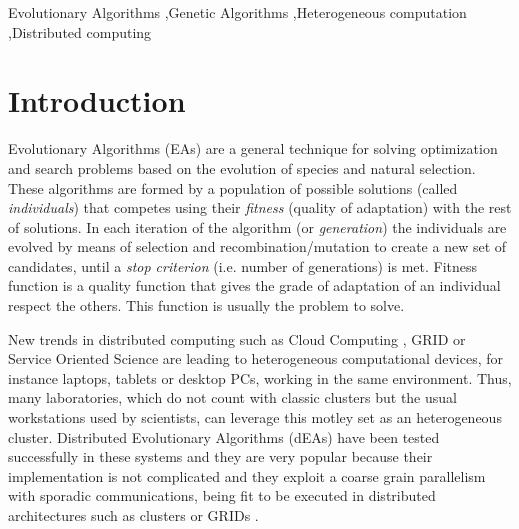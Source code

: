\documentclass[final,1p,times]{elsarticle}
\begin{document}
\begin{frontmatter}
\begin{abstract}
\end{abstract}

\begin{keyword}
Evolutionary Algorithms \sep Genetic Algorithms \sep Heterogeneous computation \sep Distributed computing
\end{keyword}

\end{frontmatter}

\section{Introduction}
\label{sec:intro}


Evolutionary Algorithms (EAs) are a general technique for solving optimization and search problems based on the evolution of species and natural selection. These algorithms are formed by a population of possible solutions (called {\em individuals}) that competes using their {\em fitness} (quality of adaptation) with the rest of solutions. In each iteration of the algorithm (or {\em generation}) the individuals are evolved by means of selection and recombination/mutation to create a new set of candidates, until a {\em stop criterion} (i.e. number of generations) is met. Fitness function is a quality function that gives the grade of adaptation of an individual respect the others. This function is usually the problem to solve.

New trends in distributed computing such as Cloud Computing \cite{CLOUD}, GRID
\cite{OPENSCIENCEGRID} or Service Oriented Science \cite{GLOBUS} are
leading to heterogeneous computational devices, for instance laptops,
tablets or desktop PCs, working in the same
environment. Thus, many laboratories, which do not count with classic
clusters but the usual workstations used by scientists, can leverage
this motley set as an heterogeneous cluster. Distributed Evolutionary
Algorithms (dEAs) \cite{MULTIKULTI,PARALLELGRIDHETEROGENEOUS} have been tested successfully in these
systems and they are very popular because their implementation is
not complicated  %
 and they exploit a coarse grain parallelism with sporadic %
 communications, being fit to be executed in distributed architectures
 such as clusters or GRIDs \cite{PLATO}.%
\end{document}
